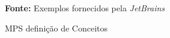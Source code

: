\begin{figure}[h!]
\centering

\caption{\textmd{MPS definição de Conceitos}}
\label{fig:mpsconceitos}

\par\medskip\textbf{Fonte:} Exemplos fornecidos pela \textit{JetBrains} \par\medskip
\end{figure}
